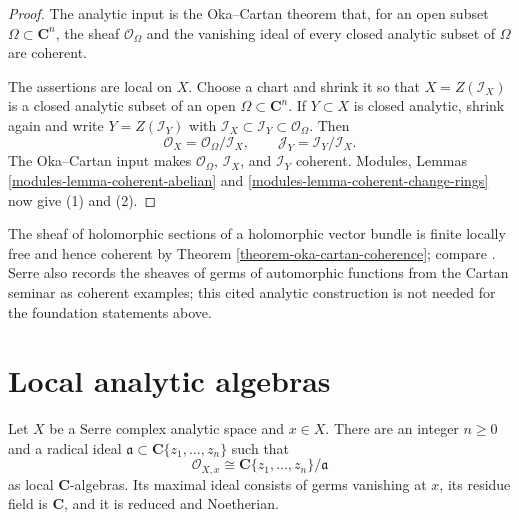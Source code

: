 \begin{proof}
The analytic input is the Oka--Cartan theorem that, for an open subset
$\Omega\subset\mathbf C^n$, the sheaf $\mathcal O_\Omega$ and the vanishing
ideal of every closed analytic subset of $\Omega$ are coherent.

The assertions are local on $X$. Choose a chart and shrink it so that
$X=Z(\mathcal I_X)$ is a closed analytic subset of an open
$\Omega\subset\mathbf C^n$. If $Y\subset X$ is closed analytic, shrink again
and write $Y=Z(\mathcal I_Y)$ with
$\mathcal I_X\subset\mathcal I_Y\subset\mathcal O_\Omega$. Then
$$
\mathcal O_X=\mathcal O_\Omega/\mathcal I_X,
\qquad
\mathcal J_Y=\mathcal I_Y/\mathcal I_X.
$$
The Oka--Cartan input makes $\mathcal O_\Omega$, $\mathcal I_X$, and
$\mathcal I_Y$ coherent. Modules, Lemmas
\ref{modules-lemma-coherent-abelian} and
\ref{modules-lemma-coherent-change-rings} now give (1) and (2).
\end{proof}

\begin{remark}[Examples]
\label{remark-examples-coherent-analytic-modules}
The sheaf of holomorphic sections of a holomorphic vector bundle is finite
locally free and hence coherent by Theorem
\ref{theorem-oka-cartan-coherence}; compare
\cite[Chapter V, Section 5.6, p. 219]{Tohoku}.
Serre also records the sheaves of germs of automorphic functions from the
Cartan seminar as coherent examples; this cited analytic construction is not
needed for the foundation statements above.
\end{remark}


\section{Local analytic algebras}
\label{section-local-analytic-algebras}

\begin{lemma}
\label{lemma-local-analytic-algebra}
\begin{reference}
\cite[\S 1, no. 4, p. 6]{GAGA}
\end{reference}
Let $X$ be a Serre complex analytic space and $x\in X$. There are an
integer $n\geq 0$ and a radical ideal
$\mathfrak a\subset\mathbf C\{z_1,\ldots,z_n\}$ such that
$$
\mathcal O_{X,x}\cong
\mathbf C\{z_1,\ldots,z_n\}/\mathfrak a
$$
as local $\mathbf C$-algebras. Its maximal ideal consists of germs vanishing
at $x$, its residue field is $\mathbf C$, and it is reduced and Noetherian.
\end{lemma}

